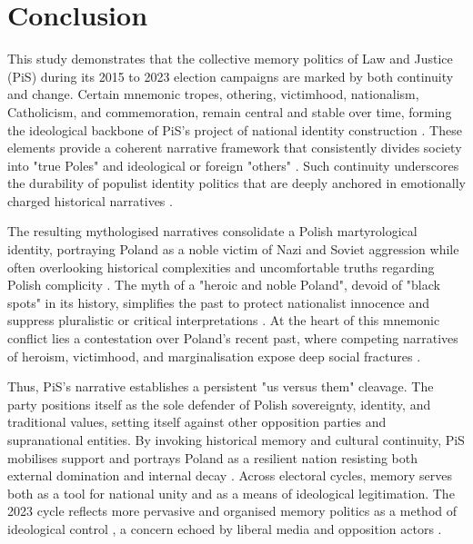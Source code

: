 \chapter[Conclusion]{Conclusion}
\label{Chap:Conclusion}

This study demonstrates that the collective memory politics of Law and Justice (PiS) during its 2015 to 2023 election campaigns are marked by both continuity and change. Certain mnemonic tropes, othering, victimhood, nationalism, Catholicism, and commemoration, remain central and stable over time, forming the ideological backbone of PiS’s project of national identity construction \citep{zuk_anti-semitic_2023}. These elements provide a coherent narrative framework that consistently divides society into "true Poles" and ideological or foreign "others" \citep{kapralski_jews_2017}. Such continuity underscores the durability of populist identity politics that are deeply anchored in emotionally charged historical narratives \citep{couperus_memory_2023}.

The resulting mythologised narratives consolidate a Polish martyrological identity, portraying Poland as a noble victim of Nazi and Soviet aggression while often overlooking historical complexities and uncomfortable truths regarding Polish complicity \citep{meijen_populist_2024}. The myth of a "heroic and noble Poland", devoid of "black spots" in its history, simplifies the past to protect nationalist innocence and suppress pluralistic or critical interpretations \citep{zuk_anti-semitic_2023}. At the heart of this mnemonic conflict lies a contestation over Poland’s recent past, where competing narratives of heroism, victimhood, and marginalisation expose deep social fractures \citep{piotrowski_between_2010}. 

Thus, PiS’s narrative establishes a persistent "us versus them" cleavage. The party positions itself as the sole defender of Polish sovereignty, identity, and traditional values, setting itself against other opposition parties and supranational entities. By invoking historical memory and cultural continuity, PiS mobilises support and portrays Poland as a resilient nation resisting both external domination and internal decay \citep{woycicka_mnemonic_2024}. Across electoral cycles, memory serves both as a tool for national unity and as a means of ideological legitimation. The 2023 cycle reflects more pervasive and organised memory politics as a method of ideological control \citep{rybicki_2025_16933320}, a concern echoed by liberal media and opposition actors \citep{woycicka_mnemonic_2024}.


